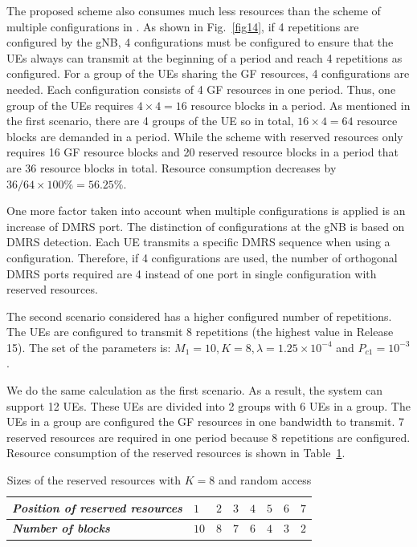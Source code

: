 \documentclass{ieeeaccess}
\begin{document}
The proposed scheme also consumes much less resources than the scheme of multiple configurations in  \cite{ref7}. As shown in Fig.~\ref{fig14}, if 4 repetitions are configured by the gNB, 4 configurations must be configured to ensure that the UEs always can transmit at the beginning of a period and reach 4 repetitions as configured. For a group of the UEs sharing the GF resources, 4 configurations are needed. Each configuration consists of 4 GF resources in one period. Thus, one group of the UEs requires $4\times4 = 16$ resource blocks in a period. As mentioned in the first scenario, there are 4 groups of the UE so in total, $16\times4 = 64$ resource blocks are demanded in a period. While the scheme with reserved resources only requires 16 GF resource blocks and 20 reserved resource blocks in a period that are 36 resource blocks in total. Resource consumption decreases by $36/64\times100\% = 56.25\%$.

One more factor taken into account when multiple configurations is applied is an increase of DMRS port. The distinction of configurations at the gNB is based on DMRS detection. Each UE transmits a specific DMRS sequence when using a configuration. Therefore, if 4 configurations are used, the number of orthogonal DMRS ports required are 4 instead of one port in single configuration with reserved resources.


The second scenario considered has a higher configured number of repetitions. The UEs are configured to transmit 8 repetitions (the highest value in Release 15). The set of the parameters is: $M_1=10, K=8, \lambda=1.25\times10^{-4}$ and $P_{c1}=10^{-3}$.

We do the same calculation as the first scenario. As a result, the system can support 12 UEs. These UEs are divided into 2 groups with 6 UEs in a group. The UEs in a group are configured the GF resources in one bandwidth to transmit. 7 reserved resources are required in one period because 8 repetitions are configured. Resource consumption of the reserved resources is shown in Table~\ref{tab4}.

\begin{table}[htbp]
\caption{Sizes of the reserved resources with $K=8$ and random access}
\begin{center}
\begin{tabular}{|p{5em}|p{2em}|p{2em}|p{2em}|p{2em}|p{2em}|p{2em}|p{2em}|}
 \hline
 \textbf{\textit{Position of reserved resources}} & $1$ &$2$ &$3$ & $4$ &$5$ &$6$ &$7$\\ 
 \hline
 \textbf{\textit{Number of blocks}} & $10$ &$8$ &$7$ & $6$ &$4$ &$3$ &$2$\\

 
 \hline
\end{tabular}
\label{tab4}
\vspace{-2mm}
\end{center}

\end{table}
\end{document}
